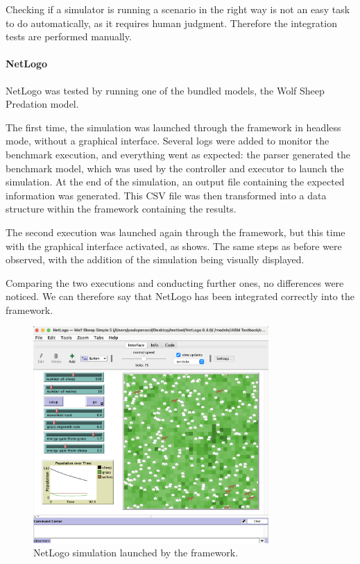\documentclass[12pt,a4paper,openright,twoside]{book}
\begin{document}
Checking if a simulator is running a scenario in the right way is not an easy task to do automatically, as it requires human judgment.
Therefore the integration tests are performed manually.

\paragraph*{NetLogo}

NetLogo was tested by running one of the bundled models, the Wolf Sheep Predation model.

The first time, the simulation was launched through the framework in headless mode, without a graphical interface.
Several logs were added to monitor the benchmark execution, and everything went as expected:
the parser generated the benchmark model, which was used by the controller and executor to launch the simulation.
At the end of the simulation, an output file containing the expected information was generated.
This CSV file was then transformed into a data structure within the framework containing the results.

The second execution was launched again through the framework, but this time with the graphical interface activated, as  shows. 
The same steps as before were observed, with the addition of the simulation being visually displayed.

Comparing the two executions and conducting further ones, no differences were noticed. 
We can therefore say that NetLogo has been integrated correctly into the framework.

\begin{figure}[h!]
  \centering
  \includegraphics[width=0.8\textwidth]{figures/netlogo-sim.png}
  \caption{NetLogo simulation launched by the framework.}
  \label{fig:netlogo-sim}
\end{figure}
\end{document}

